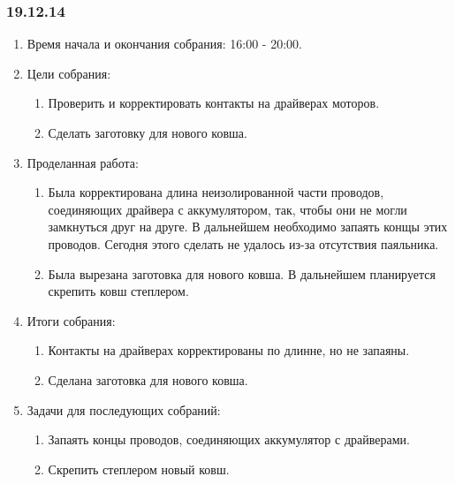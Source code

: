\subsubsection{19.12.14}
\begin{enumerate}
	\item Время начала и окончания собрания: 16:00 - 20:00.
	\item Цели собрания:
	\begin{enumerate}
		\item Проверить и корректировать контакты на драйверах моторов.
		
		\item Сделать заготовку для нового ковша.
		
	\end{enumerate}
	
	\item Проделанная работа:
	\begin{enumerate}
		\item Была корректирована длина неизолированной части проводов, соединяющих драйвера с аккумулятором, так, чтобы они не могли замкнуться друг на друге. В дальнейшем необходимо запаять конщы этих проводов. Сегодня этого сделать не удалось из-за отсутствия паяльника.
		
		\item Была вырезана заготовка для нового ковша. В дальнейшем планируется скрепить ковш степлером. 
		
	\end{enumerate}
	\item Итоги собрания:
	\begin{enumerate}
		\item Контакты на драйверах корректированы по длинне, но не запаяны.
		
		\item Сделана заготовка для нового ковша.
		

	\end{enumerate}
	
	\item Задачи для последующих собраний:
	\begin{enumerate}
		\item Запаять концы проводов, соединяющих аккумулятор с драйверами.
		
		\item Скрепить степлером новый ковш.
		
	\end{enumerate}
	
\end{enumerate}
\fillpage